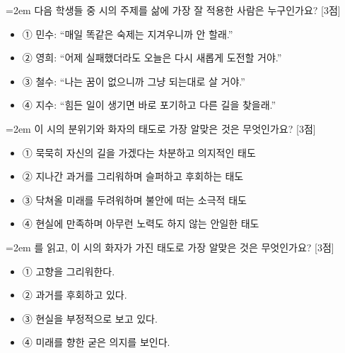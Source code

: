 \documentclass[12pt,a4paper]{article}
\newcommand{\qnum}[1]{%
  \tikz[baseline=(num.base)]{%
    \node[circle, fill=numCircle, text=white, inner sep=0pt,
          minimum size=18pt, font=\small\bfseries] (num) {#1};%
  }%
}
\newcommand{\pts}[1]{%
  \hfill\textcolor{ptsBadge}{[#1점]}%
}
\begin{document}
\vspace{4mm}
\begin{minipage}{\columnwidth}
{\hangindent=2em
\qnum{8}\enspace 다음 학생들 중 시의 주제를 삶에 가장 잘 적용한 사람은 누구인가요? \pts{3}
\par}

\vspace{3mm}
\begin{itemize}[leftmargin=2.5em, labelsep=0.3em, label={}, itemsep=4pt, parsep=1pt, topsep=0pt]
  \item ① 민수: “매일 똑같은 숙제는 지겨우니까 안 할래.”
  \item ② 영희: “어제 실패했더라도 오늘은 다시 새롭게 도전할 거야.”
  \item ③ 철수: “나는 꿈이 없으니까 그냥 되는대로 살 거야.”
  \item ④ 지수: “힘든 일이 생기면 바로 포기하고 다른 길을 찾을래.”
\end{itemize}
\end{minipage}
\vspace{4mm}

\vspace{4mm}
\begin{minipage}{\columnwidth}
{\hangindent=2em
\qnum{9}\enspace 이 시의 분위기와 화자의 태도로 가장 알맞은 것은 무엇인가요? \pts{3}
\par}

\vspace{3mm}
\begin{itemize}[leftmargin=2.5em, labelsep=0.3em, label={}, itemsep=4pt, parsep=1pt, topsep=0pt]
  \item ① 묵묵히 자신의 길을 가겠다는 차분하고 의지적인 태도
  \item ② 지나간 과거를 그리워하며 슬퍼하고 후회하는 태도
  \item ③ 닥쳐올 미래를 두려워하며 불안에 떠는 소극적 태도
  \item ④ 현실에 만족하며 아무런 노력도 하지 않는 안일한 태도
\end{itemize}
\end{minipage}
\vspace{4mm}

\vspace{4mm}
\begin{minipage}{\columnwidth}
{\hangindent=2em
\qnum{10}\enspace 를 읽고, 이 시의 화자가 가진 태도로 가장 알맞은 것은 무엇인가요? \pts{3}
\par}

\vspace{3mm}
\begin{itemize}[leftmargin=2.5em, labelsep=0.3em, label={}, itemsep=4pt, parsep=1pt, topsep=0pt]
  \item ① 고향을 그리워한다.
  \item ② 과거를 후회하고 있다.
  \item ③ 현실을 부정적으로 보고 있다.
  \item ④ 미래를 향한 굳은 의지를 보인다.
\end{itemize}
\end{minipage}
\vspace{4mm}
\end{document}
